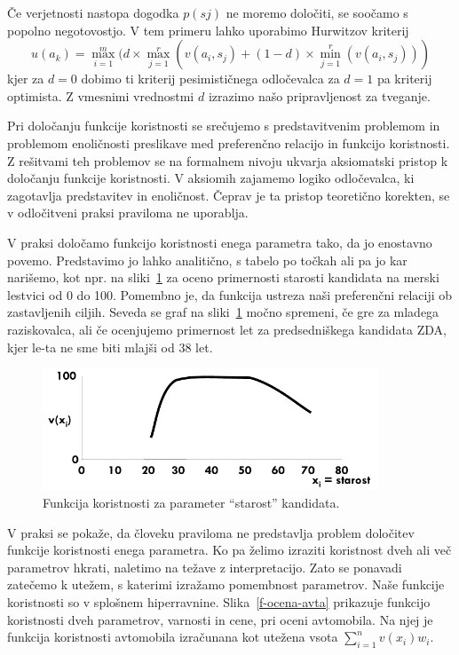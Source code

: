 Če verjetnosti nastopa dogodka $p(sj)$ ne moremo določiti, se soočamo s popolno negotovostjo. V tem primeru lahko uporabimo Hurwitzov kriterij	
%
$$ u(a_k) = \max_{i=1}^m (d\times \max_{j=1}^r(v(a_i,s_j) + (1-d)\times\min_{j=1}^r(v(a_i, s_j)) )$$
%
kjer za $d=0$ dobimo ti kriterij pesimističnega odločevalca za $d=1$ pa kriterij optimista. Z vmesnimi vrednostmi $d$ izrazimo našo pripravljenost za tveganje.

Pri določanju funkcije koristnosti se srečujemo s predstavitvenim problemom in problemom  enoličnosti preslikave med preferenčno relacijo in funkcijo koristnosti. Z rešitvami teh problemov se na formalnem nivoju ukvarja aksiomatski pristop k določanju funkcije koristnosti. V aksiomih zajamemo logiko odločevalca, ki zagotavlja predstavitev in enoličnost. Čeprav je ta pristop teoretično korekten, se v odločitveni praksi praviloma ne uporablja.

V praksi določamo funkcijo koristnosti enega parametra tako, da jo enostavno povemo. Predstavimo jo lahko analitično, s tabelo po točkah ali pa jo kar narišemo, kot npr. na sliki~\ref{f-koristnost-primer} za oceno primernosti starosti kandidata na merski lestvici od 0 do 100. Pomembno je, da funkcija ustreza naši preferenčni relaciji ob zastavljenih ciljih. Seveda se graf na sliki~\ref{f-koristnost-primer} močno spremeni, če gre za mladega raziskovalca, ali če ocenjujemo primernost let za predsedniškega kandidata ZDA, kjer le-ta ne sme biti mlajši od 38 let.

\begin{figure}[htbp]
\begin{center}
\includegraphics[width=10cm]{slike/koristnost-primer.pdf}
\caption{Funkcija koristnosti za parameter ``starost'' kandidata.}
\label{f-koristnost-primer}
\end{center}
\end{figure}
 

V praksi se pokaže, da človeku praviloma ne predstavlja problem določitev funkcije koristnosti enega parametra. Ko pa želimo izraziti koristnost dveh ali več parametrov hkrati, naletimo na težave z interpretacijo. Zato se ponavadi zatečemo k utežem, s katerimi izražamo pomembnost parametrov. Naše funkcije koristnosti so v splošnem hiperravnine. Slika~\ref{f-ocena-avta} prikazuje funkcijo koristnosti dveh parametrov, varnosti in cene, pri oceni avtomobila. Na njej je funkcija koristnosti avtomobila izračunana kot utežena vsota $\sum_{i=1}^n v(x_i) w_i$.

